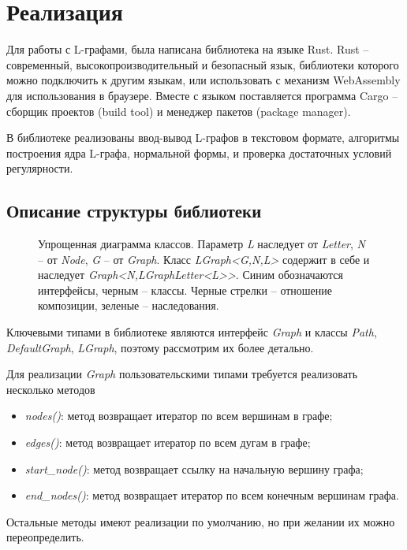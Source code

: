 \chapter{Реализация}

Для работы с L-графами, была написана библиотека на языке Rust. 
Rust -- современный, высокопроизводительный и безопасный язык, библиотеки которого
можно подключить к другим языкам, или использовать с механизм WebAssembly для использования
в браузере. Вместе с языком поставляется программа Cargo -- сборщик проектов (build tool) и менеджер
пакетов (package manager). 

В библиотеке реализованы ввод-вывод L-графов в текстовом формате, 
алгоритмы построения ядра L-графа, нормальной формы, и проверка достаточных условий регулярности.

\section{Описание структуры библиотеки}

\begin{figure}[h]
    \centering
    
    \caption{
        Упрощенная диаграмма классов. Параметр \emph{L} наследует от \emph{Letter}, \emph{N} -- от \emph{Node}, \emph{G} -- от \emph{Graph}.
        Класс \emph{LGraph<G,N,L>} содержит в себе и наследует \emph{Graph<N,LGraphLetter<L>{}>}.
        Синим обозначаются интерфейсы, черным -- классы.
        Черные стрелки -- отношение композиции, зеленые -- наследования.
    }
    \label{arch-image}
\end{figure}

Ключевыми типами в библиотеке являются интерфейс \emph{Graph} и классы \emph{Path}, \emph{DefaultGraph}, \emph{LGraph}, 
поэтому рассмотрим их более детально.

Для реализации \emph{Graph} пользовательскими типами требуется реализовать несколько методов
\begin{itemize}
    \item \emph{nodes()}: метод возвращает итератор по всем вершинам в графе;
    \item \emph{edges()}: метод возвращает итератор по всем дугам в графе;
    \item \emph{start\_node()}: метод возвращает ссылку на начальную вершину графа;
    \item \emph{end\_nodes()}: метод возвращает итератор по всем конечным вершинам графа.
\end{itemize}
Остальные методы имеют реализации по умолчанию, но при желании их можно переопределить.

